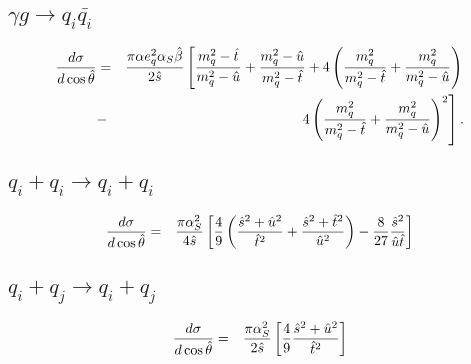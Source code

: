 \subsection{$\gamma g \rightarrow q_i\bar{q_i}$}
\begin{eqnarray}
{d\sigma \over d\cos\hat{\theta}} &=&
{\pi\alpha e_q^2 \alpha_S\hat{\beta} \over 2\hat{s} } \left[
\frac{m^2_q -\hat{t}}{m^2_q-\hat{u}}  +
 \frac{m^2_q -\hat{u}}{m^2_q-\hat{t}} +
 4 \left( \frac{m^2_q}{m^2_q-\hat{t}} + \frac{m^2_q}{m^2_q-\hat{u}}  
  \right) \right. \nonumber \\
&-& \left. 4  \left( \frac{m^2_q}{m^2_q-\hat{t}} +
\frac{m^2_q}{m^2_q-\hat{u}}  
  \right)^2 \right].
\end{eqnarray}

\subsection{$q_i + q_i \rightarrow q_i + q_i$}
\begin{eqnarray}
{d\sigma \over d\cos\hat{\theta}} &=&
{\pi\alpha_S^2 \over 4\hat{s} } 
\left[ \frac{4}{9} \left( 
{\hat{s}^2 + \hat{u}^2 \over \hat{t}^2} + 
{\hat{s}^2 + \hat{t}^2 \over \hat{u}^2} \right) 
- \frac{8}{27}{\hat{s}^2 \over \hat{u}\hat{t}} \right] \label{EQA4} 
\end{eqnarray}

\subsection{$q_i + q_j \rightarrow q_i + q_j$}
\begin{eqnarray}
{d\sigma \over d\cos\hat{\theta}} &=&
{\pi\alpha_S^2 \over 2\hat{s} } 
\left[ \frac{4}{9} {\hat{s}^2 + \hat{u}^2 \over \hat{t}^2} \right]
\end{eqnarray}

